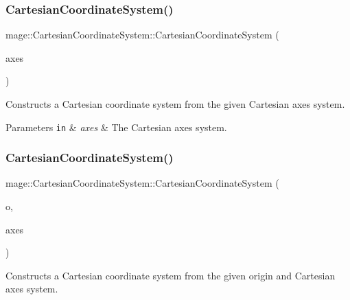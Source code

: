 \subsubsection{\texorpdfstring{Cartesian\+Coordinate\+System()}{CartesianCoordinateSystem()}\hspace{0.1cm}{\footnotesize\ttfamily [1/4]}}
{\footnotesize\ttfamily mage\+::\+Cartesian\+Coordinate\+System\+::\+Cartesian\+Coordinate\+System (\begin{DoxyParamCaption}\item[{const \hyperlink{structmage_1_1_cartesian_axes_system}{Cartesian\+Axes\+System} \&}]{axes }\end{DoxyParamCaption})\hspace{0.3cm}{\ttfamily [explicit]}}

Constructs a Cartesian coordinate system from the given Cartesian axes system.


\begin{DoxyParams}[1]{Parameters}
\mbox{\tt in}  & {\em axes} & The Cartesian axes system. \\
\hline
\end{DoxyParams}
\hypertarget{structmage_1_1_cartesian_coordinate_system_a322dc634c9192c1d1f3f4872e6255b91}{}\label{structmage_1_1_cartesian_coordinate_system_a322dc634c9192c1d1f3f4872e6255b91} 
\subsubsection{\texorpdfstring{Cartesian\+Coordinate\+System()}{CartesianCoordinateSystem()}\hspace{0.1cm}{\footnotesize\ttfamily [2/4]}}
{\footnotesize\ttfamily mage\+::\+Cartesian\+Coordinate\+System\+::\+Cartesian\+Coordinate\+System (\begin{DoxyParamCaption}\item[{const X\+M\+V\+E\+C\+T\+OR \&}]{o,  }\item[{const \hyperlink{structmage_1_1_cartesian_axes_system}{Cartesian\+Axes\+System} \&}]{axes }\end{DoxyParamCaption})}

Constructs a Cartesian coordinate system from the given origin and Cartesian axes system.



